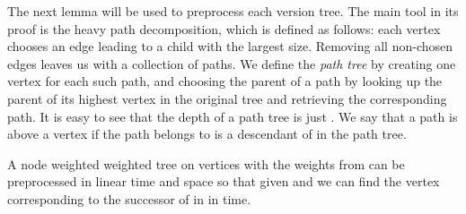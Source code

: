 \documentclass[runningheads]{llncs}
\begin{document}
The next lemma will be used to preprocess each version tree. The main tool in its proof is the heavy path decomposition, which is defined as follows: each vertex chooses an edge leading to a child with the largest size. Removing all non-chosen edges leaves us with a collection of paths. We define the \emph{path tree} by creating one vertex for each such path, and choosing the parent of a path  by looking up the parent of its highest vertex in the original tree and retrieving the corresponding path. It is easy to see that the depth of a path tree is just . We say that a path  is above a vertex  if the path  belongs to is a descendant of  in the path tree. 



\begin{lemma}\label{lemma:version preprocessing}
A node weighted weighted tree on  vertices with the weights from  can be preprocessed in linear time and space so that given  and  we can find the vertex corresponding to the successor of  in  in  time.
\end{lemma}
\end{document}
